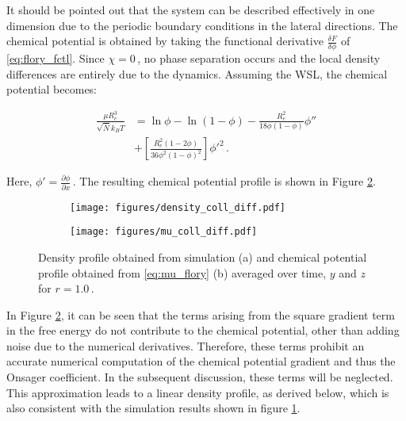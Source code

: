 \documentclass[bachelor,       %
               twoside,        %
               BCOR10mm,       %
                ngerman,english  %
               ]{GAUBM}
\begin{document}
It should be pointed out that the system can be described effectively in one dimension due to the periodic boundary conditions in the lateral directions. The chemical potential is obtained by taking the functional derivative $\frac{\delta F}{\delta\phi}$ of \eqref{eq:flory_fctl}. Since $\chi=0\,$, no phase separation occurs and the local density differences are entirely due to the dynamics. Assuming the WSL, the chemical potential becomes:


\begin{align}
  \frac{\mu R_e^3}{\sqrt{\bar N} k_BT}&=\ln\phi-\ln(1-\phi)-\frac{R_e^2}{18\phi(1-\phi)}\phi''\nonumber \\ &+\left[\frac{R_e^2(1-2\phi)}{36\phi^2(1-\phi)^2}\right]\phi'^2\,.
  \label{eq:mu_flory}
\end{align}

Here, $\phi'=\frac{\partial\phi}{\partial x}\,.$ The resulting chemical potential profile is shown in Figure \ref{fig:chemical_potential}.




\begin{figure}[h]
  \centering
  \begin{subfigure}[b]{0.45\textwidth}
      \centering
      \texttt{[image: figures/density\_coll\_diff.pdf]}
      \caption{}
      \label{fig:density_profile}
  \end{subfigure}
  \hfill
  \begin{subfigure}[b]{0.45\textwidth}
      \centering
      \texttt{[image: figures/mu\_coll\_diff.pdf]}
      \caption{}
      \label{fig:chemical_potential}
  \end{subfigure}
     \caption{Density profile obtained from simulation (a) and chemical potential profile obtained from \eqref{eq:mu_flory} (b)  averaged over time, $y$ and $z$ for $r=1.0\,$. }
     \label{fig:mu_phi}
\end{figure}


In Figure \ref{fig:chemical_potential}, it can be seen that the terms arising from the square gradient term in the free energy do not contribute to the chemical potential, other than adding noise due to the numerical derivatives. Therefore, these terms prohibit an accurate numerical computation of the chemical potential gradient and thus the Onsager coefficient. In the subsequent discussion, these terms will be neglected. This approximation leads to a linear density profile, as derived below, which is also consistent with the simulation results shown in figure \ref{fig:density_profile}.
\end{document}
